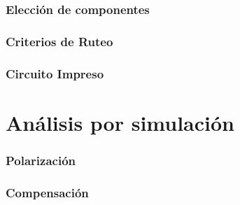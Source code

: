 \documentclass[10pt,a4paper]{article}
\begin{document}
		\section{Elección de componentes}\label{sec:componentes}
			

		\section{Criterios de Ruteo}\label{sec:ruteo}
			

		\section{Circuito Impreso}
			
	\part{Análisis por simulación}\label{part:sim}
		
		\section{Polarización}\label{sec:sim_pol}
			
		
		\section{Compensación}\label{sec:sim_compensacion}
			
\end{document}

